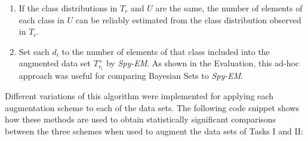 \documentclass[12pt,twoside,notitlepage,amsart]{report} %
\begin{document}
	
	\begin{enumerate} 
	
	\item If the class distributions in $T_r$ and $U$ are the same, the number of elements of each class in $U$ can be reliably estimated from the class distribution observed in $T_r$. %
	  
	\item Set each $d_i$ to the number of elements of that class included into the augmented data set $T_{r_i}^{+}$ by \emph{Spy-EM}. As shown in the Evaluation, this ad-hoc approach was useful for comparing Bayesian Sets to \emph{Spy-EM}. %
	
	\end{enumerate}
	
	
Different variations of this algorithm were implemented for applying each augmentation scheme to each of the data sets. The following code snippet shows how these methods are used to obtain statistically significant comparisons between the three schemes when used to augment the data sets of Tasks I and II: 
	

\lstset{linewidth=16cm}
\end{document}
